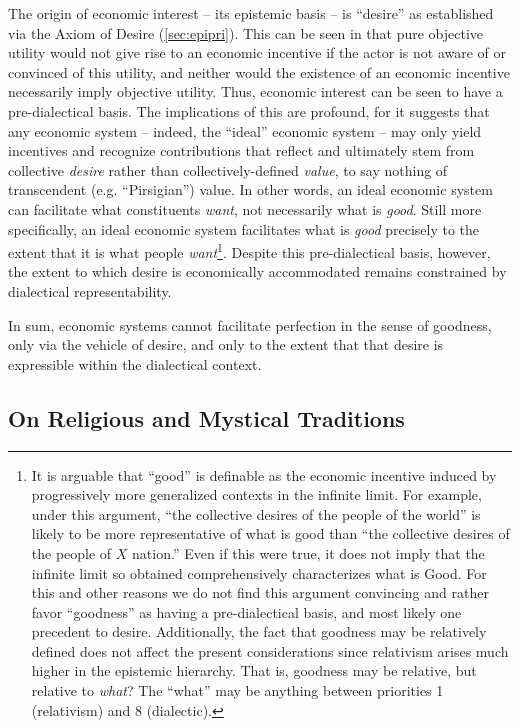 \documentclass[pra,twocolumn,groupedaddress,10pt]{revtex4}
\theoremstyle{definition}
\begin{document}
The origin of economic interest -- its epistemic basis -- is ``desire'' as established via the Axiom of Desire (\autoref{sec:epipri}). This can be seen in that pure objective utility would not give rise to an economic incentive if the actor is not aware of or convinced of this utility, and neither would the existence of an economic incentive necessarily imply objective utility. Thus, economic interest can be seen to have a pre-dialectical basis. The implications of this are profound, for it suggests that any economic system -- indeed, the ``ideal'' economic system -- may only yield incentives and recognize contributions that reflect and ultimately stem from collective \emph{desire} rather than collectively-defined \emph{value}, to say nothing of transcendent (e.g. ``Pirsigian''\cite{pirsig}) value. In other words, an ideal economic system can facilitate what constituents \emph{want}, not necessarily what is \emph{good}. Still more specifically, an ideal economic system facilitates what is \emph{good} precisely to the extent that it is what people \emph{want}\footnote{It is arguable that ``good'' is definable as the economic incentive induced by progressively more generalized contexts in the infinite limit. For example, under this argument, ``the collective desires of the people of the world'' is likely to be more representative of what is good than ``the collective desires of the people of $X$ nation.'' Even if this were true, it does not imply that the infinite limit so obtained comprehensively characterizes what is Good. For this and other reasons we do not find this argument convincing and rather favor ``goodness'' as having a pre-dialectical basis, and most likely one precedent to desire. Additionally, the fact that goodness may be relatively defined does not affect the present considerations since relativism arises much higher in the epistemic hierarchy. That is, goodness may be relative, but relative to \emph{what}? The ``what'' may be anything between priorities 1 (relativism) and 8 (dialectic).}. Despite this pre-dialectical basis, however, the extent to which desire is economically accommodated remains constrained by dialectical representability.

In sum, economic systems cannot facilitate perfection in the sense of goodness, only via the vehicle of desire, and only to the extent that that desire is expressible within the dialectical context.

\subsection{On Religious and Mystical Traditions} \label{sec:phirelhistra}
\end{document}
